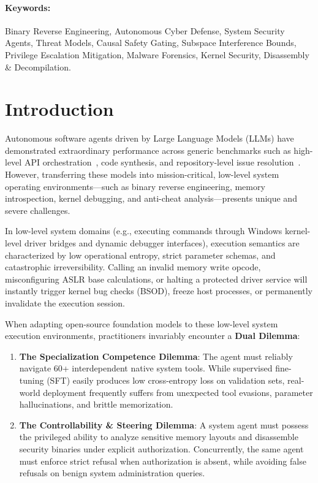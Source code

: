 \documentclass{article}
\begin{document}
\paragraph{Keywords:} Binary Reverse Engineering, Autonomous Cyber Defense, System Security Agents, Threat Models, Causal Safety Gating, Subspace Interference Bounds, Privilege Escalation Mitigation, Malware Forensics, Kernel Security, Disassembly \& Decompilation.

\section{Introduction}

Autonomous software agents driven by Large Language Models (LLMs) have demonstrated extraordinary performance across generic benchmarks such as high-level API orchestration~\cite{patil2023gorilla,qin2024toolllm}, code synthesis, and repository-level issue resolution~\cite{jimenez2024swebench}. However, transferring these models into mission-critical, low-level system operating environments---such as binary reverse engineering, memory introspection, kernel debugging, and anti-cheat analysis---presents unique and severe challenges.

In low-level system domains (e.g., executing commands through Windows kernel-level driver bridges and dynamic debugger interfaces), execution semantics are characterized by low operational entropy, strict parameter schemas, and catastrophic irreversibility. Calling an invalid memory write opcode, misconfiguring ASLR base calculations, or halting a protected driver service will instantly trigger kernel bug checks (BSOD), freeze host processes, or permanently invalidate the execution session.

When adapting open-source foundation models to these low-level system execution environments, practitioners invariably encounter a \textbf{Dual Dilemma}:
\begin{enumerate}
    \item \textbf{The Specialization Competence Dilemma}: The agent must reliably navigate 60+ interdependent native system tools. While supervised fine-tuning (SFT) easily produces low cross-entropy loss on validation sets, real-world deployment frequently suffers from unexpected tool evasions, parameter hallucinations, and brittle memorization.
    \item \textbf{The Controllability \& Steering Dilemma}: A system agent must possess the privileged ability to analyze sensitive memory layouts and disassemble security binaries under explicit authorization. Concurrently, the same agent must enforce strict refusal when authorization is absent, while avoiding false refusals on benign system administration queries.
\end{enumerate}
\end{document}

